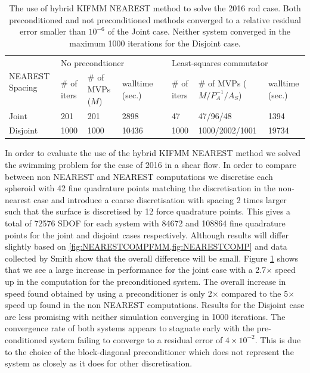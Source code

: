 \begin{table}
\begin{singlespace}
\centering
\setlength{\tabcolsep}{6pt}
\renewcommand{\arraystretch}{1.4}
\caption[The use of hybrid KIFMM NEAREST method to solve the 2016 rod case.]{The use of hybrid KIFMM NEAREST method to solve the 2016 rod case. Both preconditioned and not preconditioned methods converged to a relative residual error smaller than $10^{-6}$ of the Joint case. Neither system converged in the maximum 1000 iterations for the Disjoint case.}
\small
\begin{tabular}{p{2cm} p{0.75cm} p{2cm} p{1.0cm} p{0.1cm} p{0.75cm} p{2.5cm} p{1.5cm}}
\multirow{2}{*}{\parbox{1.8cm}{NEAREST Spacing}} & \multicolumn{3}{l}{No precondtioner} & & \multicolumn{3}{l}{Least-squares commutator} \\ \cline{2-4} \cline{6-8}
  & \# of iters & \# of MVPs ($M$) & walltime (sec.) & & \# of iters & \# of MVPs ($M/P_A^{-1}/A_S$) & walltime (sec.) \\ \hline
  Joint & 201 & 201 & 2898 & &  47 & 47/96/48 & 1394\\
  Disjoint & 1000 & 1000 & 10436 & & 1000 & 1000/2002/1001 & 19734
\end{tabular}
\label{tab:PreconditioningNear}
\end{singlespace}
\end{table}

In order to evaluate the use of the hybrid KIFMM NEAREST method we solved the swimming problem for the case of 2016 in a shear flow. In order to compare between non NEAREST and NEAREST computations we discretise each spheroid with 42 fine quadrature points matching the discretisation in the non-nearest case and introduce a coarse discretisation with spacing 2 times larger such that the surface is discretised by 12 force quadrature points.  This gives a total of 72576 SDOF for each system with 84672 and 108864 fine quadrature points for the joint and disjoint cases respectively. Although results will differ slightly based on \cref{fig:NEARESTCOMPFMM,fig:NEARESTCOMP} and data collected by Smith \cite{Smith2018AEquation} show that the overall difference will be small. Figure \ref{tab:PreconditioningNear} shows that we see a large increase in performance for the joint case with a 2.7$\times$ speed up in the computation for the preconditioned system. The overall increase in speed found obtained by using a preconditioner is only 2$\times$ compared to the 5$\times$ speed up found in the non NEAREST computations. Results for the Disjoint case are less promising with neither simulation converging in 1000 iterations. The convergence rate of both systems appears to stagnate early with the pre-conditioned system failing to converge to a residual error of $4\times 10^{-2}$. This is due to the choice of the block-diagonal preconditioner which does not represent the system as closely as it does for other discretisation. 

